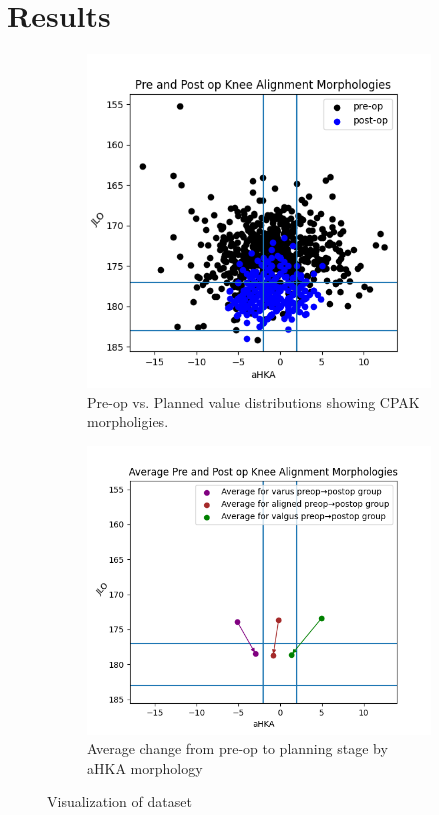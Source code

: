 \documentclass{article}
\begin{document}
	
\section{Results}

\begin{figure}[ht]
	\begin{subfigure}{.45\linewidth}
		\includegraphics[width=\linewidth]{data_vis.png}
		\caption{Pre-op vs. Planned value distributions showing CPAK morpholigies.}
		\label{data_vis}
	\end{subfigure}
	\hfill
	\begin{subfigure}{.45\linewidth}
		\includegraphics[width=\linewidth]{avg_vis.png}
		\caption{Average change from pre-op to planning stage by aHKA morphology}
		\label{avg_vis}
	\end{subfigure}
	\caption{Visualization of dataset}
\end{figure}
\end{document}
